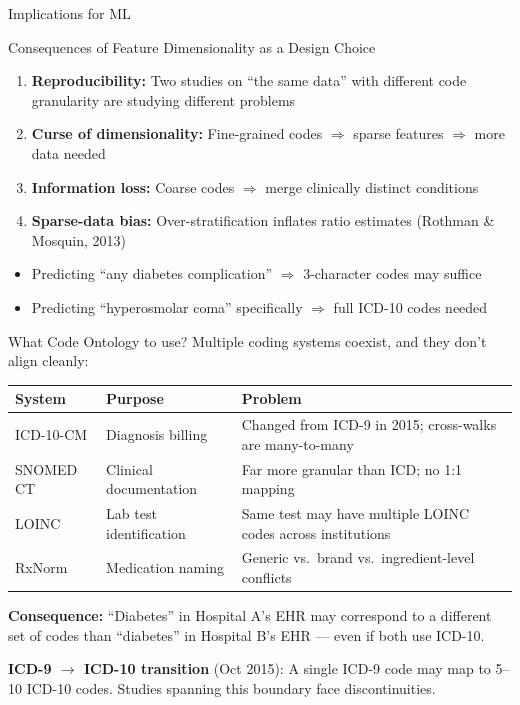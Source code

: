 \documentclass[aspectratio=169,10pt]{beamer}
\begin{document}
\begin{frame}{Implications for ML}
\begin{block}{Consequences of Feature Dimensionality as a Design Choice}
\begin{enumerate}
    \item \textbf{Reproducibility:} Two studies on ``the same data'' with different code granularity are studying different problems
    \item \textbf{Curse of dimensionality:} Fine-grained codes $\Rightarrow$ sparse features $\Rightarrow$ more data needed
    \item \textbf{Information loss:} Coarse codes $\Rightarrow$ merge clinically distinct conditions
    \item \textbf{Sparse-data bias:} Over-stratification inflates ratio estimates (Rothman \& Mosquin, 2013)
\end{enumerate}
\end{block}

\vspace{0.5em}
\begin{itemize}
    \item Predicting ``any diabetes complication'' $\Rightarrow$ 3-character codes may suffice
    \item Predicting ``hyperosmolar coma'' specifically $\Rightarrow$ full ICD-10 codes needed
\end{itemize}
\end{frame}
\begin{frame}{What Code Ontology to use?}
Multiple coding systems coexist, and they don't align cleanly:

\vspace{0.3em}
\begin{center}
\scriptsize
\begin{tabular}{lll}
\toprule
\textbf{System} & \textbf{Purpose} & \textbf{Problem} \\
\midrule
ICD-10-CM & Diagnosis billing & Changed from ICD-9 in 2015; cross-walks are many-to-many \\
SNOMED CT & Clinical documentation & Far more granular than ICD; no 1:1 mapping \\
LOINC & Lab test identification & Same test may have multiple LOINC codes across institutions \\
RxNorm & Medication naming & Generic vs.\ brand vs.\ ingredient-level conflicts \\
\bottomrule
\end{tabular}
\end{center}

\vspace{0.3em}
\textbf{Consequence:} ``Diabetes'' in Hospital A's EHR may correspond to a different set of codes than ``diabetes'' in Hospital B's EHR --- even if both use ICD-10.

\vspace{0.2em}
\textbf{ICD-9 $\to$ ICD-10 transition} (Oct 2015): A single ICD-9 code may map to 5--10 ICD-10 codes. Studies spanning this boundary face discontinuities.
\end{frame}
\end{document}
